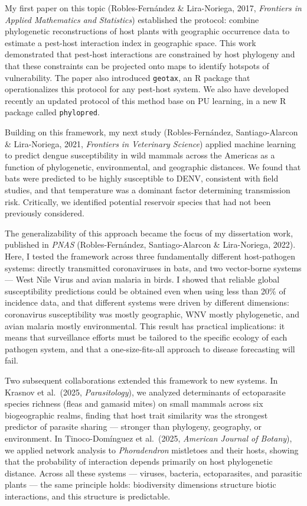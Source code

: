 \documentclass[11pt,letterpaper]{article}
\begin{document}
My first paper on this topic (Robles-Fernández \& Lira-Noriega, 2017,
\emph{Frontiers in Applied Mathematics and Statistics}) established the
protocol: combine phylogenetic reconstructions of host plants with
geographic occurrence data to estimate a pest-host interaction index in geographic space. This work demonstrated that pest-host interactions are constrained by host phylogeny and that these constraints can be
projected onto maps to identify hotspots of vulnerability. The paper
also introduced \texttt{geotax}, an R package that operationalizes this
protocol for any pest-host system. We also have developed recently an updated protocol of this method base on PU learning, in a new R package called \texttt{phylopred}.

Building on this framework, my next study (Robles-Fernández,
Santiago-Alarcon \& Lira-Noriega, 2021, \emph{Frontiers in Veterinary
Science}) applied machine learning to predict dengue susceptibility in
wild mammals across the Americas as a function of phylogenetic,
environmental, and geographic distances. We found that bats were
predicted to be highly susceptible to DENV, consistent with field
studies, and that temperature was a dominant factor determining
transmission risk. Critically, we identified potential reservoir species
that had not been previously considered.

The generalizability of this approach became the focus of my
dissertation work, published in \emph{PNAS} (Robles-Fernández,
Santiago-Alarcon \& Lira-Noriega, 2022). Here, I tested the framework
across three fundamentally different host-pathogen systems: directly
transmitted coronaviruses in bats, and two vector-borne systems --- West
Nile Virus and avian malaria in birds. I showed that reliable global
susceptibility predictions could be obtained even when using less than
20\% of incidence data, and that different systems were driven by
different dimensions: coronavirus susceptibility was mostly geographic,
WNV mostly phylogenetic, and avian malaria mostly environmental. This
result has practical implications: it means that surveillance efforts
must be tailored to the specific ecology of each pathogen system, and
that a one-size-fits-all approach to disease forecasting will fail.

Two subsequent collaborations extended this framework to new systems. In
Krasnov et al.~(2025, \emph{Parasitology}), we analyzed determinants of
ectoparasite species richness (fleas and gamasid mites) on small mammals
across six biogeographic realms, finding that host trait similarity was
the strongest predictor of parasite sharing --- stronger than phylogeny,
geography, or environment. In Tinoco-Domínguez et al.~(2025,
\emph{American Journal of Botany}), we applied network analysis to
\emph{Phoradendron} mistletoes and their hosts, showing that the
probability of interaction depends primarily on host phylogenetic
distance. Across all these systems --- viruses, bacteria, ectoparasites,
and parasitic plants --- the same principle holds: biodiversity
dimensions structure biotic interactions, and this structure is
predictable.
\end{document}
